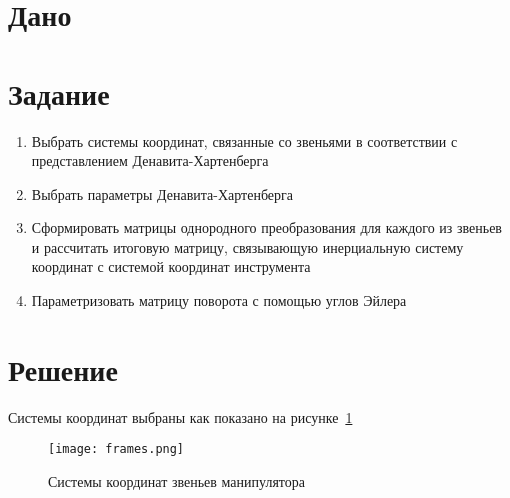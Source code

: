 \documentclass[14pt]{extarticle}
\begin{document}
    

    \section*{Дано}

    \section*{Задание}
    \begin{enumerate}
        \item Выбрать системы координат, связанные со звеньями в соответствии с представлением Денавита-Хартенберга
        \item Выбрать параметры Денавита-Хартенберга
        \item Сформировать матрицы однородного преобразования для каждого из звеньев и рассчитать итоговую матрицу,
        связывающую инерциальную систему координат с системой координат инструмента
        \item Параметризовать матрицу поворота с помощью углов Эйлера
    \end{enumerate}

    \section*{Решение}
    Системы координат выбраны как показано на рисунке~\ref{pic:frames}
    \begin{figure}[H]
        \centering
        \texttt{[image: frames.png]}
        \caption{Системы координат звеньев манипулятора}
        \label{pic:frames}
    \end{figure}
\end{document}

